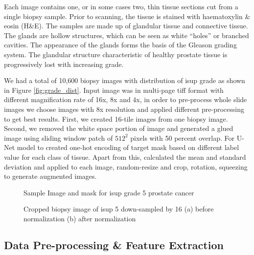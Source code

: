 \documentclass[10pt,twocolumn,letterpaper]{article}
\begin{document}
 Each image contains one, or in some cases two, thin tissue sections cut from a single biopsy sample. Prior to scanning, the tissue is stained with haematoxylin \& eosin (H\&E). The samples are made up of glandular tissue and connective tissue. The glands are hollow structures, which can be seen as white “holes” or branched cavities. The appearance of the glands forms the basis of the Gleason grading system. The glandular structure characteristic of healthy prostate tissue is progressively lost with increasing grade. 

We had a total of 10,600 biopsy images with distribution of isup grade as shown in Figure \ref{fig:grade_dist}.  Input image was in multi-page tiff format with different magnification rate of 16x, 8x and 4x, in order to pre-process whole slide images we choose images with 8x resolution and applied different pre-processing to get best results. First, we created 16-tile images from one biopsy image. Second, we removed the white space portion of image and generated a glued image using sliding window patch of $512^2$ pixels with 50 percent overlap. For U-Net model to created one-hot encoding of target mask based on different label value for each class of tissue. Apart from this, calculated the mean and standard deviation and applied to each image, random-resize and crop, rotation, squeezing to generate augmented images.

\begin{figure}[t]
\begin{center}
\end{center}
   \caption{Sample Image and mask for isup grade 5 prostate cancer }
\label{biopsy_sample}
\end{figure}

\begin{figure}[t]
\begin{center}
\end{center}
  \caption{Cropped biopsy image of isup 5 down-sampled by 16 (a) before normalization (b) after normalization}
\label{fig:biopsy_crop}
\end{figure}



\subsection{Data Pre-processing \& Feature Extraction}
\end{document}
